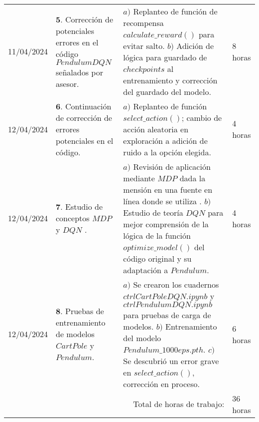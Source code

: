 \documentclass[12pt]{article}
\begin{document}
\hfill\\
\begin{minipage}[h]{\textwidth}
	\centering
	\begin{tabularx}{\textwidth}{|p{2cm}|X|X|p{2cm}|} 
		\hline		
		
	 	11/04/2024 & 
	 	$\mathbf{5}.$ Corrección de potenciales errores en el código $PendulumDQN$ señalados por asesor. &
	 	$a)$ Replanteo de función de recompensa $calculate\_ reward()$ para evitar salto. \newline
	 	$b)$ Adición de lógica para guardado de $checkpoints$ al entrenamiento y corrección del guardado del modelo. \newline & 
	 	8 horas \\
	 	12/04/2024 & 
	 	$\mathbf{6}.$ Continuación de corrección de errores potenciales en el código. &
	 	$a)$ Replanteo de función $select\_ action()$; cambio de acción aleatoria en exploración a adición de ruido a la opción elegida. \newline & 
	 	4 horas \\
	 	12/04/2024 & 
	 	$\mathbf{7}.$ Estudio de conceptos $MDP$ \cite{PAlvaradoMDP1} y $DQN$ \cite{PAlvaradoDQN1} . &
	 	$a)$ Revisión de aplicación mediante $MDP$ dada la mensión en una fuente en línea donde se utiliza \cite{CartPoleRLcrtl1}. \newline
	 	$b)$ Estudio de teoría $DQN$ para mejor comprensión de la lógica de la función $optimize\_ model()$ del código original \cite{DQNCart} y su adaptación a $Pendulum$. \newline & 
	 	4 horas \\
	 	12/04/2024 & 
	 	$\mathbf{8}.$ Pruebas de entrenamiento de modelos $CartPole$ y $Pendulum$. &
	 	$a)$ Se crearon los cuadernos $ctrlCartPoleDQN.ipynb$ y $ctrlPendulumDQN.ipynb$ para pruebas de carga de modelos. \newline
	 	$b)$ Entrenamiento del modelo $Pendulum\_1000eps.pth$. \newline
	 	$c)$ Se descubrió un error grave en $select\_action()$, corrección en proceso. \newline & 
	 	6 horas \\
	 	
	 	\hline
		\multicolumn{3}{|r|}{Total de horas de trabajo:} & 36 horas \\ 
	 	\hline                 
	\end{tabularx}
\end{minipage}
\end{document}
